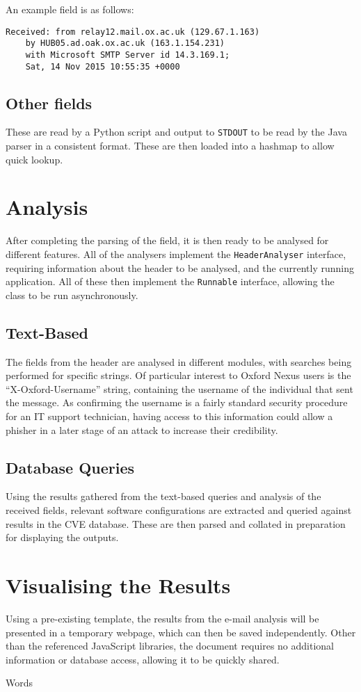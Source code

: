 An example field is as follows:
\begin{verbatim}
Received: from relay12.mail.ox.ac.uk (129.67.1.163) 
    by HUB05.ad.oak.ox.ac.uk (163.1.154.231) 
    with Microsoft SMTP Server id 14.3.169.1;
    Sat, 14 Nov 2015 10:55:35 +0000
\end{verbatim}
\subsection{Other fields}
These are read by a Python script and output to \texttt{STDOUT} to be read by the Java parser in a consistent format.  These are then loaded into a hashmap to allow quick lookup.

\section{Analysis}
After completing the parsing of the field, it is then ready to be analysed for different features.  All of the analysers implement the \texttt{HeaderAnalyser} interface, requiring information about the header to be analysed, and the currently running application.  All of these then implement the \texttt{Runnable} interface, allowing the class to be run asynchronously.

\subsection{Text-Based}
The fields from the header are analysed in different modules, with searches being performed for specific strings.  Of particular interest to Oxford Nexus users is the ``X-Oxford-Username'' string, containing the username of the individual that sent the message.  As confirming the username is a fairly standard security procedure for an IT support technician, having access to this information could allow a phisher in a later stage of an attack to increase their credibility.

\subsection{Database Queries}
Using the results gathered from the text-based queries and analysis of the received fields, relevant software configurations are extracted and queried against results in the CVE database.  These are then parsed and collated in preparation for displaying the outputs.

\section{Visualising the Results}
Using a pre-existing template, the results from the e-mail analysis will be presented in a temporary webpage, which can then be saved independently.  Other than the referenced JavaScript libraries, the document requires no additional information or database access, allowing it to be quickly shared.

\begin{algorithm}\caption{Words}
\end{algorithm}
